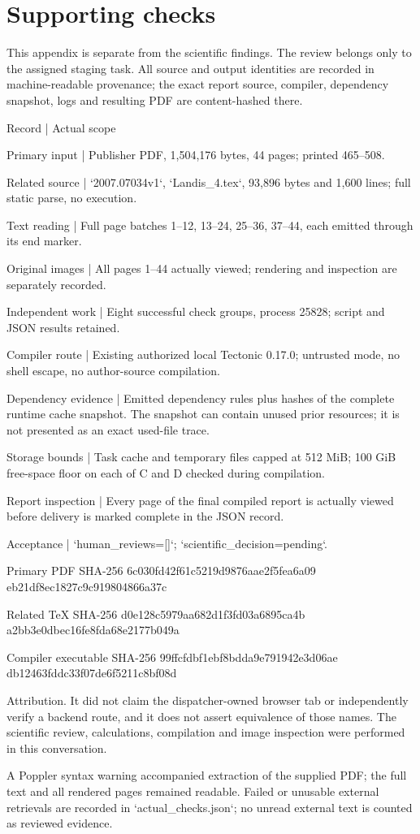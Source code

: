 \documentclass[10pt]{article}
\begin{document}
\section*{Supporting checks}
This appendix is separate from the scientific findings. The review belongs only to the assigned staging task. All source and output identities are recorded in machine-readable provenance; the exact report source, compiler, dependency snapshot, logs and resulting PDF are content-hashed there.\par
Record | Actual scope\par
Primary input | Publisher PDF, 1,504,176 bytes, 44 pages; printed 465–508.\par
Related source | `2007.07034v1`, `Landis\_4.tex`, 93,896 bytes and 1,600 lines; full static parse, no execution.\par
Text reading | Full page batches 1–12, 13–24, 25–36, 37–44, each emitted through its end marker.\par
Original images | All pages 1–44 actually viewed; rendering and inspection are separately recorded.\par
Independent work | Eight successful check groups, process 25828; script and JSON results retained.\par
Compiler route | Existing authorized local Tectonic 0.17.0; untrusted mode, no shell escape, no author-source compilation.\par
Dependency evidence | Emitted dependency rules plus hashes of the complete runtime cache snapshot. The snapshot can contain unused prior resources; it is not presented as an exact used-file trace.\par
Storage bounds | Task cache and temporary files capped at 512 MiB; 100 GiB free-space floor on each of C and D checked during compilation.\par
Report inspection | Every page of the final compiled report is actually viewed before delivery is marked complete in the JSON record.\par
Acceptance | `human\_reviews=[]`; `scientific\_decision=pending`.\par
Primary PDF SHA-256
 6c030fd42f61c5219d9876aae2f5fea6a09
eb21df8ec1827c9c919804866a37c\par
Related TeX SHA-256
 d0e128c5979aa682d1f3fd03a6895ca4b
a2bb3e0dbec16fe8fda68e2177b049a\par
Compiler executable SHA-256
 99ffcfdbf1ebf8bdda9e791942e3d06ae
db12463fddc33f07de6f5211c8bf08d\par
Attribution. It did not claim the dispatcher-owned browser tab or independently verify a backend route, and it does not assert equivalence of those names. The scientific review, calculations, compilation and image inspection were performed in this conversation.\par
A Poppler syntax warning accompanied extraction of the supplied PDF; the full text and all rendered pages remained readable. Failed or unusable external retrievals are recorded in `actual\_checks.json`; no unread external text is counted as reviewed evidence.\par
\end{document}
